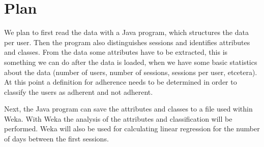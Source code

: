 \section{Plan}
We plan to first read the data with a Java program, which structures the data per user. Then the program also distinguishes sessions and identifies attributes and classes. From the data some attributes have to be extracted, this is something we can do after the data is loaded, when we have some basic statistics about the data (number of users, number of sessions, sessions per user, etcetera). At this point a definition for adherence needs to be determined in order to classify the users as adherent and not adherent.

Next, the Java program can save the attributes and classes to a  file used within Weka. With Weka the analysis of the attributes and classification will be performed. Weka will also be used for calculating linear regression for the number of days between the first sessions.